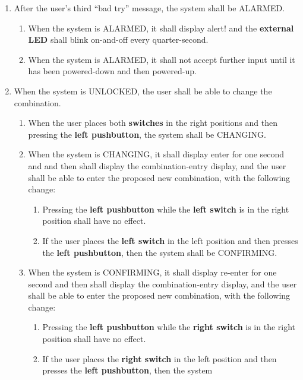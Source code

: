 \begin{enumerate}
\item After the user's third ``bad try'' message, the system shall be ALARMED.
    \begin{enumerate}
    \item When the system is ALARMED, it shall display {\dviiseg alert!} and
        the \textbf{external LED} shall blink on-and-off every quarter-second.
    \item When the system is ALARMED, it shall not accept further input until
        it has been powered-down and then powered-up.
    \end{enumerate}
\item \label{spec:changeCombination} When the system is UNLOCKED, the user shall
    be able to change the combination.
    \begin{enumerate}
    \item When the user places both \textbf{switches} in the right positions and
        then pressing the \textbf{left pushbutton}, the system shall be
        CHANGING.
    \item When the system is CHANGING, it shall display {\dviiseg enter} for
        one second and and then shall display the combination-entry display, and
        the user shall be able to enter the proposed new combination, with the
        following change:
        \begin{enumerate}
        \item Pressing the \textbf{left pushbutton} while the
            \textbf{left switch} is in the right position shall have no effect.
        \item If the user places the \textbf{left switch} in the left position
            and then presses the \textbf{left pushbutton}, then the system
            shall be CONFIRMING.
        \end{enumerate}
    \item When the system is CONFIRMING, it shall display {\dviiseg re-enter}
        for one second and then shall display the combination-entry display, and
        the user shall be able to enter the proposed new combination, with the
        following change:
        \begin{enumerate}
        \item Pressing the \textbf{left pushbutton} while the
            \textbf{right switch} is in the right position shall have no effect.
        \item If the user places the \textbf{right switch} in the left position
            and then presses the \textbf{left pushbutton}, then the system

\end{enumerate}
\end{enumerate}
\end{enumerate}
